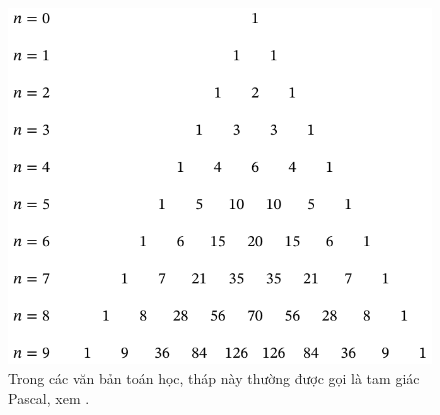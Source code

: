 \documentclass[12pt]{article} %
\begin{document}
\begin{figure}[htbp]
    \centering
    \includegraphics[scale=1]{./tex-images/thap-he-so-nhi-thuc-den-n-bang-9/thap-he-so-nhi-thuc-den-n-bang-9.pdf}
    \caption{Trong các văn bản toán học, tháp này thường được gọi là tam giác Pascal, xem \cite{edwards2019pascal}.}
    \label{fig:thap-he-so-nhi-thuc-den-n-bang-9}
\end{figure}
\end{document}

